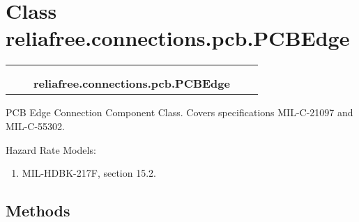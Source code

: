 %
%
%


\section{Class reliafree.connections.pcb.PCBEdge}

    \label{reliafree:connections:pcb:PCBEdge}
\begin{tabular}{cccccc}
\multicolumn{2}{r}{\settowidth{\BCL}{reliafree.connections.connection.Connection}\multirow{2}{\BCL}{reliafree.connections.connection.Connection}}
&&
  \\\cline{3-3}
  &&\multicolumn{1}{c|}{}
&&
  \\
&&\multicolumn{2}{l}{\textbf{reliafree.connections.pcb.PCBEdge}}
\end{tabular}

PCB Edge Connection Component Class. Covers specifications MIL-C-21097 and 
MIL-C-55302.

Hazard Rate Models:

\begin{enumerate}

\setlength{\parskip}{0.5ex}
  \item MIL-HDBK-217F, section 15.2.

\end{enumerate}



  \subsection{Methods}

    \vspace{0.5ex}


